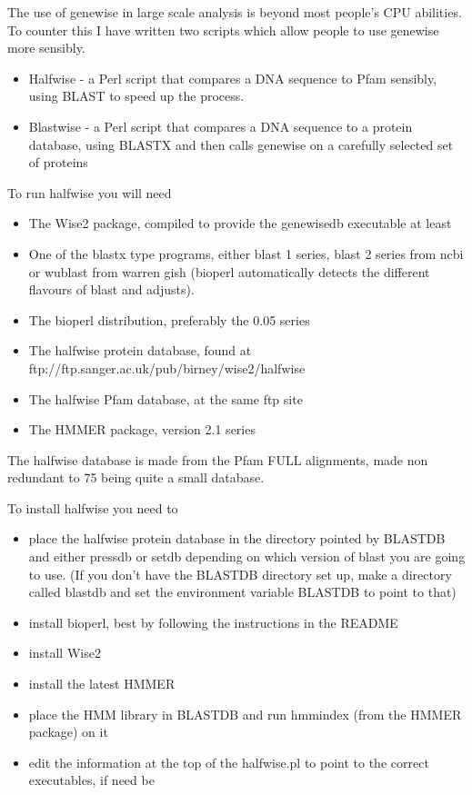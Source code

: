 \documentclass{article}
\begin{document}
The use of genewise in large scale analysis is beyond most people's CPU
abilities. To counter this I have written two scripts which allow people
to use genewise more sensibly.
\begin{itemize}
\item Halfwise - a Perl script that compares a DNA sequence to Pfam sensibly,
using BLAST to speed up the process.
\item Blastwise - a Perl script that compares a DNA sequence to a protein
database, using BLASTX and then calls genewise on a carefully selected 
set of proteins 
\end{itemize}
To run halfwise you will need
\begin{itemize}
\item The Wise2 package, compiled to provide the genewisedb executable at least
\item One of the blastx type programs, either blast 1 series, blast 2 series from ncbi or wublast from
warren gish (bioperl automatically detects the different flavours of blast and adjusts).
\item The bioperl distribution, preferably the 0.05 series
\item The halfwise protein database, found at ftp://ftp.sanger.ac.uk/pub/birney/wise2/halfwise
\item The halfwise Pfam database, at the same ftp site
\item The HMMER package, version 2.1 series
\end{itemize}

The halfwise database is made from the Pfam FULL alignments, made non redundant to 
75%
being quite a small database.

To install halfwise you need to
\begin{itemize}
\item place the halfwise protein database in the directory pointed by BLASTDB and either
pressdb or setdb depending on which version of blast you are going to use. (If you don't have
the BLASTDB directory set up, make a directory called blastdb and set the environment variable
BLASTDB to point to that)
\item install bioperl, best by following the instructions in the README
\item install Wise2
\item install the latest HMMER 
\item place the HMM library in BLASTDB and run hmmindex (from the HMMER package) on it
\item edit the information at the top of the halfwise.pl to point to the correct executables, if need be
\end{itemize}
\end{document}
